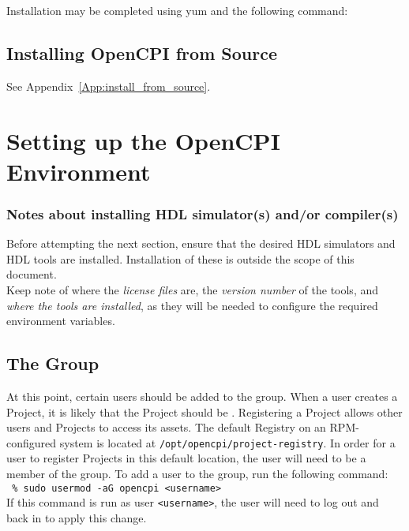 Installation may be completed using yum and the following command:\\


\subsection{Installing OpenCPI from Source}
See Appendix~\ref{App:install_from_source}.

\section{Setting up the OpenCPI Environment}
\label{sec:setup_opencpi}
\subsubsection*{Notes about installing HDL simulator(s) and/or compiler(s)}
Before attempting the next section, ensure that the desired HDL simulators and HDL tools are installed. Installation of these is outside the scope of this document.\\

Keep note of where the \textit{license files} are, the \textit{version number} of the tools, and \textit{where the tools are installed}, as they will be needed to configure the required environment variables.

\subsection{The  Group}
\label{subsec:opencpi_group}
At this point, certain users should be added to the  group. When a user creates a Project, it is likely that the Project should be . Registering a Project allows other users and Projects to access its assets. The default Registry on an RPM-configured system is located at \verb+/opt/opencpi/project-registry+. In order for a user to register Projects in this default location, the user will need to be a member of the  group. To add a user to the  group, run the following command:\\

\verb+ % sudo usermod -aG opencpi <username>+\\

If this command is run as user \verb+<username>+, the user will need to log out and back in to apply this change.\\

